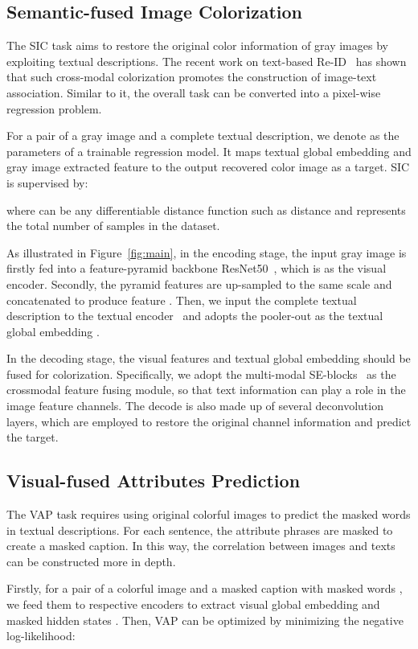 \documentclass[10pt,twocolumn,letterpaper]{article}
\begin{document}
\subsection{Semantic-fused Image Colorization}
The SIC task aims to restore the original color information of gray images by exploiting textual descriptions. The recent work on text-based Re-ID~\cite{Lapscore} has shown that such cross-modal colorization promotes the construction of image-text association. Similar to it, the overall task can be converted into a pixel-wise regression problem.

 For a pair of a gray image and a complete textual description, we denote  as the parameters of a trainable regression model. It maps textual global embedding  and gray image extracted feature  to the output recovered color image  as a target. SIC is supervised by:

where  can be any differentiable distance function such as  distance and  represents the total number of samples in the dataset.

As illustrated in Figure~\ref{fig:main}, in the encoding stage, the input gray image is firstly fed into a feature-pyramid backbone ResNet50~\cite{CLIP,fpn}, which is as the visual encoder. Secondly, the pyramid features are up-sampled to the same scale and concatenated to produce feature . Then, we input the complete textual description to the textual encoder~\cite{bert} and adopts the pooler-out as the textual global embedding . 

In the decoding stage, the visual features and textual global embedding should be fused for colorization. Specifically, we adopt the multi-modal SE-blocks~\cite{Lapscore} as the crossmodal feature fusing module, so that text information can play a role in the image feature channels. The decode is also made up of several deconvolution layers, which are employed to restore the original channel information and predict the target.

 \subsection{Visual-fused Attributes Prediction}
The VAP task requires using original colorful images to predict the masked words in textual descriptions. For each sentence, the attribute phrases are masked to create a masked caption. In this way, the correlation between images and texts can be constructed more in depth.

Firstly, for a pair of a colorful image and a masked caption with masked words , we feed them to respective encoders to extract visual global embedding  and masked hidden states . Then, VAP can be optimized by minimizing the negative log-likelihood:
\end{document}

